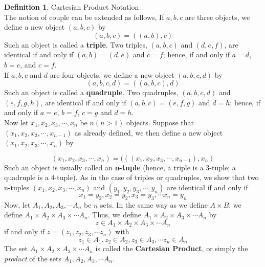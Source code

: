 \documentclass{book}
\theoremstyle{definition}
\newtheorem{definition}{Definition}[section]
\theoremstyle{remark}
\begin{document}
\begin{definition}
Cartesian Product Notation \\

The notion of couple can be extended as follows, If $a,b,c$ are three objects, we define a new object $(a,b,c)$ by 
    \begin{equation*}
        (a,b,c) = ((a,b), c)
    \end{equation*}
Such an object is called a \textbf{triple}. Two triples, $(a,b,c)$ and $(d,e,f)$, are identical if and only if $(a,b)=(d,e)$ and $c=f$; hence, if and only if $a=d$, $b=e$, and $c=f$. \\

If $a, b, c$ and $d$ are four objects, we define a new object $(a,b,c,d)$ by 
    \begin{equation*}
        (a,b,c,d) = ((a,b,c), d)
    \end{equation*}
Such an object is called a \textbf{quadruple}. Two quadruples, $(a,b,c,d)$ and $(e,f,g,h)$, are identical if and only if $(a,b,c)=(e,f,g)$ and $d=h$; hence, if and only if $a=e$, $b=f$, $c=g$ and $d=h$. \\

Now let $x_1, x_2, x_3, \cdots, x_n$ be $n(n>1)$ objects. Suppose that \footnotemark $(x_1, x_2, x_3, \cdots, x_{n-1})$ as already defined, we then define a new object $(x_1, x_2, x_3, \cdots, x_n)$ by

    \begin{equation*}
        (x_1, x_2, x_3, \cdots, x_n) = (((x_1, x_2, x_3, \cdots, x_{n-1}), x_n)
    \end{equation*}
Such an object is usually called an \textbf{n-tuple} (hence, a triple is a 3-tuple; a quadruple is a 4-tuple). As in the case of triples or quadruples, we show that two n-tuples $(x_1, x_2, x_3, \cdots, x_n)$ and $(y_1, y_2, y_3, \cdots, y_n)$ are identical if and only if
    \begin{equation*}
        x_1=y_2, x_2=y_2, x_3=y_3, \cdots x_n=y_n 
    \end{equation*}
Now, let $A_1, A_2, A_3, \cdots A_n$ be $n$ sets. In the same way as we define $A \times B$, we define $A_1 \times A_2 \times A_3 \times \cdots A_n$. Thus, we define $A_1 \times A_2 \times A_3 \times \cdots A_n$ by 
     \begin{equation*}
        z \in A_1 \times A_2 \times A_3 \times \cdots A_n
    \end{equation*}
if and only if $z=(z_1, z_2, z_3, \cdots z_n)$ with 
    \begin{equation*}
        z_1 \in A_1, z_2 \in A_2, z_3 \in A_3, \cdots z_n \in A_n
    \end{equation*}
The set $A_1 \times A_2 \times A_3 \times \cdots A_n$ is called the \textbf{Cartesian Product}, or simply the \textit{product} of the sets $A_1, A_2, A_3, \cdots A_n$. \\


\end{definition}
\end{document}
